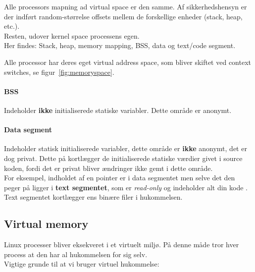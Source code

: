 Alle processors mapning ad virtual space er den samme. Af sikkerhedshensyn er der indført random-størrelse offsets mellem de forskellige enheder (stack, heap, etc.).\\

Resten, udover kernel space processens egen.\\

Her findes: Stack, heap, memory mapping, BSS, data og text/code segment.


Alle processor har deres eget virtual address space, som bliver skiftet ved context switches, se figur~\ref{fig:memoryspace}. 

\paragraph{BSS}
Indeholder \textbf{ikke} initialiserede statiske variabler. Dette område er anonymt.

\paragraph{Data segment}
Indeholder statisk initialiserede variabler, dette område er \textbf{ikke} anonymt, det er dog privat. Dette på kortlægger de initialiserede statiske værdier givet i source koden, fordi det er privat bliver ændringer ikke gemt i dette område.\\

For eksempel, indholdet af en pointer er i data segmentet  men selve det den peger på ligger i \textbf{text segmentet}, som er \textit{read-only} og indeholder alt din kode . Text segmentet kortlægger ens binære filer i hukommelsen.

\subsection{Virtual memory}
Linux processer bliver eksekveret i et virtuelt miljø. På denne måde tror hver process at den har al hukommelsen for sig selv.\\

Vigtige grunde til at vi bruger virtuel hukommelse:

